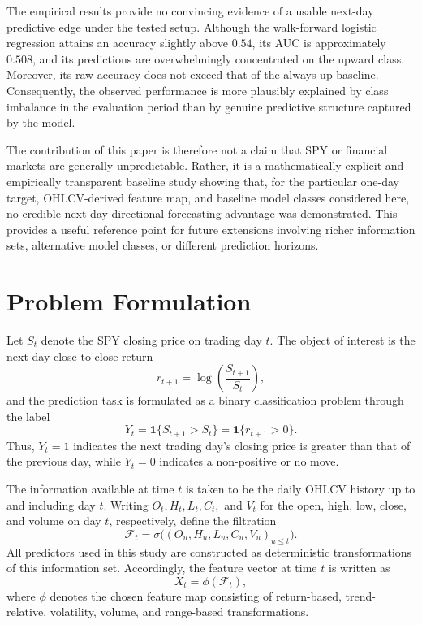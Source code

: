 \documentclass[11pt,a4paper]{article}
\begin{document}
	The empirical results provide no convincing evidence of a usable next-day predictive edge under the tested setup. Although the walk-forward logistic regression attains an accuracy slightly above \(0.54\), its AUC is approximately \(0.508\), and its predictions are overwhelmingly concentrated on the upward class. Moreover, its raw accuracy does not exceed that of the always-up baseline. Consequently, the observed performance is more plausibly explained by class imbalance in the evaluation period than by genuine predictive structure captured by the model.
	
	The contribution of this paper is therefore not a claim that SPY or financial markets are generally unpredictable. Rather, it is a mathematically explicit and empirically transparent baseline study showing that, for the particular one-day target, OHLCV-derived feature map, and baseline model classes considered here, no credible next-day directional forecasting advantage was demonstrated. This provides a useful reference point for future extensions involving richer information sets, alternative model classes, or different prediction horizons.
	
	\section{Problem Formulation}
	
	Let \(S_t\) denote the SPY closing price on trading day \(t\). The object of interest is the next-day close-to-close return
	\[
	r_{t+1} = \log\!\left(\frac{S_{t+1}}{S_t}\right),
	\]
	and the prediction task is formulated as a binary classification problem through the label
	\[
	Y_t = \mathbf{1}\{S_{t+1} > S_t\} = \mathbf{1}\{r_{t+1} > 0\}.
	\]
	Thus, \(Y_t = 1\) indicates the next trading day's closing price is greater than that of the previous day, while \(Y_t = 0\) indicates a non-positive or no move.
	
	The information available at time \(t\) is taken to be the daily OHLCV history up to and including day \(t\). Writing \(O_t, H_t, L_t, C_t,\) and \(V_t\) for the open, high, low, close, and volume on day \(t\), respectively, define the filtration
	\[
	\mathcal{F}_t = \sigma\!\big( (O_u, H_u, L_u, C_u, V_u)_{u \leq t} \big).
	\]
	All predictors used in this study are constructed as deterministic transformations of this information set. Accordingly, the feature vector at time \(t\) is written as
	\[
	X_t = \phi(\mathcal{F}_t),
	\]
	where \(\phi\) denotes the chosen feature map consisting of return-based, trend-relative, volatility, volume, and range-based transformations.
	
\end{document}

